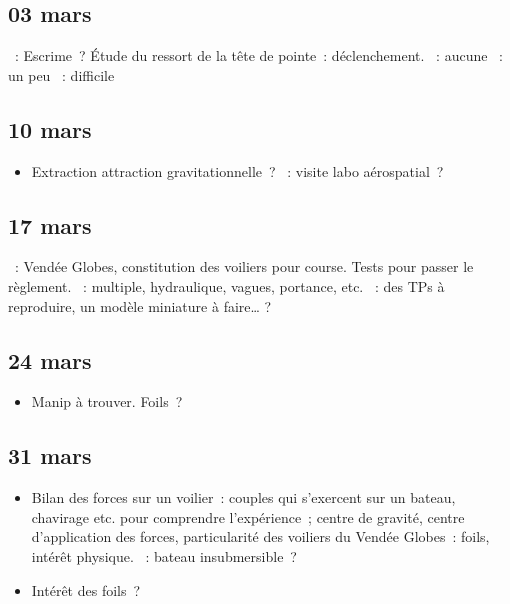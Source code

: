 \documentclass[a4paper, 11pt, final, garamond]{book}
\begin{document}
\subsection{03 mars}
\begin{itemize}
    ~: Escrime~? Étude du ressort de la tête de pointe~:
        déclenchement.
    ~: aucune
    ~: un peu
    ~: difficile
\end{itemize}

\subsection{10 mars}
\begin{itemize}
    ~: envoi marteau JO par Thor
    ~: rattraper sonde Voyageur~?
    \item Extraction attraction gravitationnelle~?
    ~: visite labo aérospatial~?
\end{itemize}

\subsection{17 mars}
\begin{itemize}
    ~: Vendée Globes, constitution des voiliers pour course. Tests
        pour passer le règlement.
    ~: multiple, hydraulique, vagues, portance, etc.
    ~: des TPs à reproduire, un modèle miniature à faire… ?
\end{itemize}

\subsection{24 mars}
\begin{itemize}
    ~:
        \begin{enumerate}[label=\Roman*]
            \item Vendée Globes présentation
            \item Participer à la course~: jauge IMOCA~; test à \ang{90}, à
                \ang{180}.
        \end{enumerate}
    ~: fournie, à détailler.
    \item Manip à trouver. Foils~?
\end{itemize}

\subsection{31 mars}
\begin{itemize}
  \item Bilan des forces sur un voilier~: couples qui s'exercent sur un bateau,
    chavirage etc. pour comprendre l'expérience~; centre de gravité, centre
    d'application des forces, particularité des voiliers du Vendée Globes~:
    foils, intérêt physique.
  ~: bateau insubmersible~?
  \item Intérêt des foils~?
\end{itemize}
\end{document}
